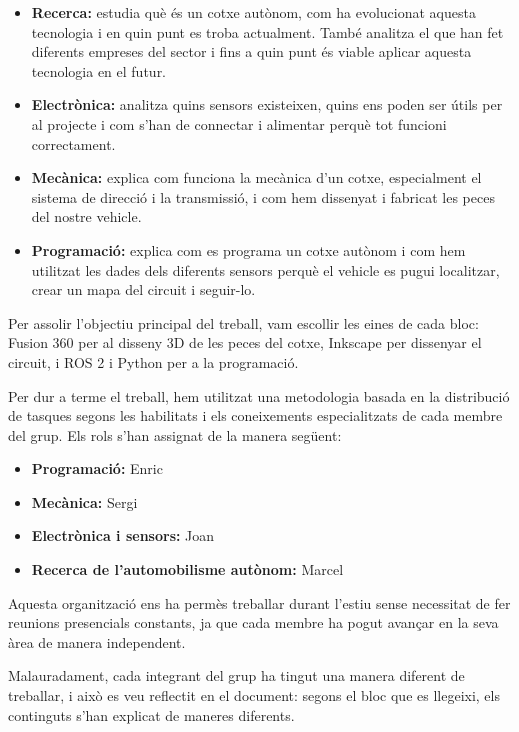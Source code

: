 \documentclass[11pt,a4paper]{article}
\begin{document}
\begin{itemize}
  \item \textbf{Recerca:} estudia què és un cotxe autònom, com ha evolucionat aquesta tecnologia i en quin punt es troba actualment. També analitza el que han fet diferents empreses del sector i fins a quin punt és viable aplicar aquesta tecnologia en el futur.
  \item \textbf{Electrònica:} analitza quins sensors existeixen, quins ens poden ser útils per al projecte i com s’han de connectar i alimentar perquè tot funcioni correctament.
  \item \textbf{Mecànica:} explica com funciona la mecànica d’un cotxe, especialment el sistema de direcció i la transmissió, i com hem dissenyat i fabricat les peces del nostre vehicle.
  \item \textbf{Programació:} explica com es programa un cotxe autònom i com hem utilitzat les dades dels diferents sensors perquè el vehicle es pugui localitzar, crear un mapa del circuit i seguir-lo.
\end{itemize}

Per assolir l’objectiu principal del treball, vam escollir les eines de cada bloc: Fusion 360 per al disseny 3D de les peces del cotxe, Inkscape per dissenyar el circuit, i ROS 2 i Python per a la programació.

Per dur a terme el treball, hem utilitzat una metodologia basada en la distribució de tasques segons les habilitats i els coneixements especialitzats de cada membre del grup. Els rols s’han assignat de la manera següent:
\nopagebreak

\begin{itemize}
  \item \textbf{Programació:} Enric
  \item \textbf{Mecànica:} Sergi
  \item \textbf{Electrònica i sensors:} Joan
  \item \textbf{Recerca de l’automobilisme autònom:} Marcel
\end{itemize}

Aquesta organització ens ha permès treballar durant l’estiu sense necessitat de fer reunions presencials constants, ja que cada membre ha pogut avançar en la seva àrea de manera independent.

Malauradament, cada integrant del grup ha tingut una manera diferent de treballar, i això es veu reflectit en el document: segons el bloc que es llegeixi, els continguts s’han explicat de maneres diferents.
\end{document}
